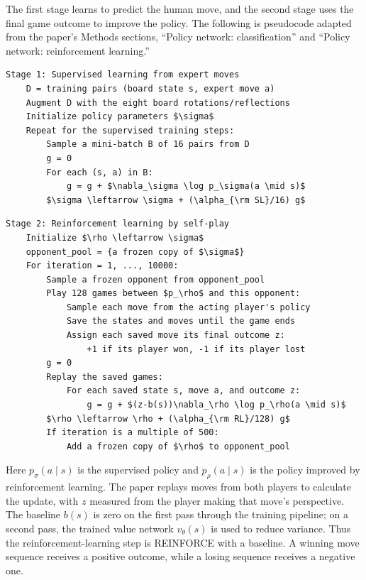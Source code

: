 \documentclass[12pt]{article}
\begin{document}
\begin{enumerate}
\begin{enumerate}[a)]
        The first stage learns to predict the human move, and the second stage
        uses the final game outcome to improve the policy. The following is
        pseudocode adapted from the paper's Methods sections, ``Policy network:
        classification'' and ``Policy network: reinforcement learning.''

\par\medskip
\noindent\begin{minipage}{\linewidth}
\begin{lstlisting}[language={},mathescape=true]
Stage 1: Supervised learning from expert moves
    D = training pairs (board state s, expert move a)
    Augment D with the eight board rotations/reflections
    Initialize policy parameters $\sigma$
    Repeat for the supervised training steps:
        Sample a mini-batch B of 16 pairs from D
        g = 0
        For each (s, a) in B:
            g = g + $\nabla_\sigma \log p_\sigma(a \mid s)$
        $\sigma \leftarrow \sigma + (\alpha_{\rm SL}/16) g$

\end{lstlisting}
\end{minipage}
\par\medskip
\noindent\begin{minipage}{\linewidth}
\begin{lstlisting}[language={},mathescape=true]
Stage 2: Reinforcement learning by self-play
    Initialize $\rho \leftarrow \sigma$
    opponent_pool = {a frozen copy of $\sigma$}
    For iteration = 1, ..., 10000:
        Sample a frozen opponent from opponent_pool
        Play 128 games between $p_\rho$ and this opponent:
            Sample each move from the acting player's policy
            Save the states and moves until the game ends
            Assign each saved move its final outcome z:
                +1 if its player won, -1 if its player lost
        g = 0
        Replay the saved games:
            For each saved state s, move a, and outcome z:
                g = g + $(z-b(s))\nabla_\rho \log p_\rho(a \mid s)$
        $\rho \leftarrow \rho + (\alpha_{\rm RL}/128) g$
        If iteration is a multiple of 500:
            Add a frozen copy of $\rho$ to opponent_pool
\end{lstlisting}
\end{minipage}
\par\medskip

        Here $p_\sigma(a\mid s)$ is the supervised policy and
        $p_\rho(a\mid s)$ is the policy improved by reinforcement learning.
        The paper replays moves from both players to calculate the update,
        with $z$ measured from the player making that move's perspective.
        The baseline $b(s)$ is zero on the first pass through the training
        pipeline; on a second pass, the trained value network $v_\theta(s)$
        is used to reduce variance. Thus the reinforcement-learning step is
        REINFORCE with a baseline. A winning move sequence receives a
        positive outcome, while a losing sequence receives a negative one.
       

\end{enumerate}
\end{enumerate}
\end{document}
